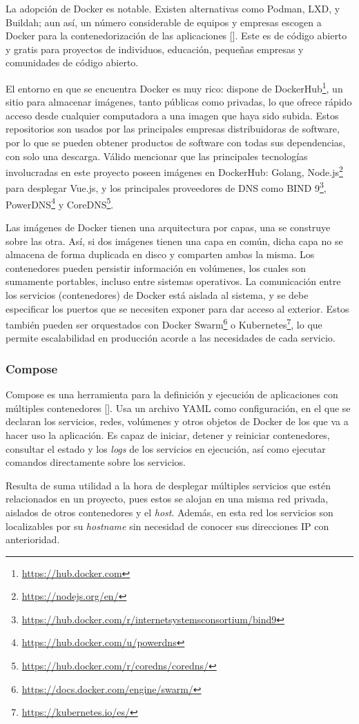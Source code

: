 La adopción de Docker es notable. Existen alternativas como Podman, LXD, y Buildah; aun así, un número considerable de equipos y empresas escogen a Docker para la contenedorización de las aplicaciones [\cite{docker-usage}]. Este es de código abierto y gratis para proyectos de individuos, educación, pequeñas empresas y comunidades de código abierto.

El entorno en que se encuentra Docker es muy rico: dispone de DockerHub\footnote{\url{https://hub.docker.com}}, un sitio para almacenar imágenes, tanto públicas como privadas, lo que ofrece rápido acceso desde cualquier computadora a una imagen que haya sido subida. Estos repositorios son usados por las principales empresas distribuidoras de software, por lo que se pueden obtener productos de software con todas sus dependencias, con solo una descarga. Válido mencionar que las principales tecnologías involucradas en este proyecto poseen imágenes en DockerHub: Golang, Node.js\footnote{\url{https://nodejs.org/en/}} para desplegar Vue.js, y los principales proveedores de DNS como BIND 9\footnote{\url{https://hub.docker.com/r/internetsystemsconsortium/bind9}}, PowerDNS\footnote{\url{https://hub.docker.com/u/powerdns}} y CoreDNS\footnote{\url{https://hub.docker.com/r/coredns/coredns/}}.

Las imágenes de Docker tienen una arquitectura por capas, una se construye sobre las otra. Así, si dos imágenes tienen una capa en común, dicha capa no se almacena de forma duplicada en disco y comparten ambas la misma. Los contenedores pueden persistir información en volúmenes, los cuales son sumamente portables, incluso entre sistemas operativos. La comunicación entre los servicios (contenedores) de Docker está aislada al sistema, y se debe especificar los puertos que se necesiten exponer para dar acceso al exterior. Estos también pueden ser orquestados con Docker Swarm\footnote{\url{https://docs.docker.com/engine/swarm/}} o Kubernetes\footnote{\url{https://kubernetes.io/es/}}, lo que permite escalabilidad en producción acorde a las necesidades de cada servicio.

\subsubsection{Compose}

Compose es una herramienta para la definición y ejecución de aplicaciones con múltiples contenedores [\cite{docker-compose}]. Usa un archivo YAML como configuración, en el que se declaran los servicios, redes, volúmenes y otros objetos de Docker de los que va a hacer uso la aplicación. Es capaz de iniciar, detener y reiniciar contenedores, consultar el estado y los \textit{logs} de los servicios en ejecución, así como ejecutar comandos directamente sobre los servicios.      

Resulta de suma utilidad a la hora de desplegar múltiples servicios que estén relacionados en un proyecto, pues estos se alojan en una misma red privada, aislados de otros contenedores y el \textit{host}. Además, en esta red los servicios son localizables por su \textit{hostname} sin necesidad de conocer sus direcciones IP con anterioridad.


